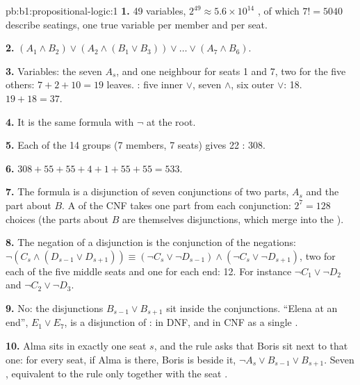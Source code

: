 \begin{solution}{pb:b1:propositional-logic:1}
\textbf{1.} 49 variables, $2^{49} \approx 5.6 \times 10^{14}$ , of which $7! = 5040$ describe seatings, one
true variable per member and per seat.

\textbf{2.} $(A_1 \wedge B_2) \vee (A_2 \wedge (B_1 \vee B_3)) \vee \dots \vee (A_7 \wedge B_6)$.

\textbf{3.} Variables: the seven $A_s$, and one neighbour for seats 1 and 7, two for the five others: $7 + 2 + 10 = 19$
leaves. : five inner $\vee$, seven $\wedge$, six outer $\vee$: 18. $19 + 18 = 37$.

\textbf{4.} It is the same formula with $\neg$ at the root.

\textbf{5.} Each of the 14 groups (7 members, 7 seats) gives 22 : 308.

\textbf{6.} $308 + 55 + 55 + 4 + 1 + 55 + 55 = 533$.

\textbf{7.} The formula is a disjunction of seven conjunctions of two parts, $A_s$ and the part about $B$. A  of
the CNF takes one part from each conjunction: $2^7 = 128$ choices (the parts about $B$ are themselves disjunctions,
which merge into the ).

\textbf{8.} The negation of a disjunction is the conjunction of the negations: $\neg(C_s \wedge (D_{s-1} \vee D_{s+1}))
\equiv (\neg C_s \vee \neg D_{s-1}) \wedge (\neg C_s \vee \neg D_{s+1})$, two  for each of the five middle seats
and one for each end: 12. For instance $\neg C_1 \vee \neg D_2$ and $\neg C_2 \vee \neg D_3$.

\textbf{9.} No: the disjunctions $B_{s-1} \vee B_{s+1}$ sit inside the conjunctions. ``Elena at an end'', $E_1 \vee
E_7$, is a disjunction of : in DNF, and in CNF as a single .

\textbf{10.} Alma sits in exactly one seat $s$, and the rule asks that Boris sit next to that one: for every seat, if
Alma is there, Boris is beside it, $\neg A_s \vee B_{s-1} \vee B_{s+1}$. Seven , equivalent to the rule only
together with the seat .


\end{solution}
